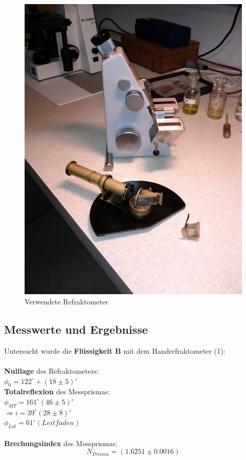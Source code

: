 \documentclass[12pt,a4paper]{article}
\begin{document}
\begin{multicols}{2}
\begin{figure}[H]
	\centering
	\includegraphics[angle=-90,scale=0.11]{./figure/refrakto.jpg}
	\caption{Verwendete Refraktometer}
	\label{fig:geraete_refrakto}
\end{figure}



\subsection{Messwerte und Ergebnisse}
Untersucht wurde die \textbf{Flüssigkeit B} mit dem Handrefraktometer (1): \\
\\
\textbf{Nulllage} des Refraktometers:\\
\indent $\phi_0 = 122^\circ +(18 \pm 5)'$\\
\textbf{Totalreflexion} des Messprismas:\\
\indent $\phi_{MT} = 161^\circ (46\pm 5)'$\\
\indent $\Rightarrow i=39^\circ (28 \pm 8)' $\\
\indent $\phi_{Lot} = 61^\circ (Leitfaden)$\\
\\
\textbf{Brechungsindex} des Messprismas:
$$N_{Prisma} = (1.6251 \pm 0.0016)$$%
\\


\end{multicols}
\end{document}
